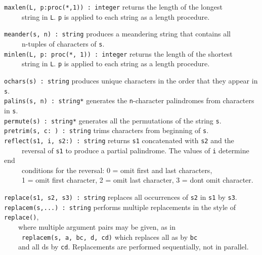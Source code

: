 \texttt{maxlen(L, p:proc({\textquotedbl}*{\textquotedbl},1)) : integer}
returns the length of the longest\\
 \ \ \ \ \ string in \texttt{L}. \texttt{p} is applied to each string as
a {\textquotedbl}length{\textquotedbl} procedure.

\texttt{meander(s, n) : string} produces a
{\textquotedbl}meandering{\textquotedbl} string that contains
all\\
 \ \ \ \ \ n-tuples of characters of \texttt{s}.\\
\texttt{minlen(L, p: proc({\textquotedbl}*{\textquotedbl}, 1)) :
integer} returns the length of the shortest\\
 \ \ \ \ \ string in \texttt{L}. \texttt{p} is applied to each string as
a {\textquotedbl}length{\textquotedbl} procedure.

\texttt{ochars(s) : string} produces unique characters in the order that
they appear in \texttt{s}.\\
\texttt{palins(s, n) : string*} generates the \texttt{n}{}-character
palindromes from characters in \texttt{s}.\\
\texttt{permute(s) : string*} generates all the permutations of the
string \texttt{s}.\\
\texttt{pretrim(s, c:{\textquotesingle} {\textquotesingle}) : string}
trims characters from beginning of \texttt{s}.\\
\texttt{reflect(s1, i, s2:{\textquotedbl}{\textquotedbl}) : string}
returns \texttt{s1} concatenated with \texttt{s2} and the\\
 \ \ \ \ \ reversal of \texttt{s1} to produce a partial palindrome. The
values of \texttt{i} determine {\textquotedbl}end\\
 \ \ \ \ \ conditions{\textquotedbl} for the reversal: 0 = omit first
and last characters,\\
 \ \ \ \ \ 1 = omit first character, 2 = omit last character, 3 =
don{\textquotesingle}t omit character.

\texttt{replace(s1, s2, s3) : string} replaces all occurrences of
\texttt{s2} in \texttt{s1} by \texttt{s3}.\\
\texttt{replacem(s,...) : string} performs multiple replacements in the style of \texttt{replace()},\\
 \ \ \ \ where multiple
argument pairs may be given, as in\\
 \ \ \ \ \ \texttt{replacem(s, {\textquotedbl}a{\textquotedbl},
{\textquotedbl}bc{\textquotedbl}, {\textquotedbl}d{\textquotedbl},
{\textquotedbl}cd{\textquotedbl})} which replaces all
a{\textquotesingle}s by
\texttt{{\textquotedbl}bc{\textquotedbl}}\\
\ \ \ \ and all d{\textquotesingle}s by
\texttt{{\textquotedbl}cd{\textquotedbl}}. Replacements are performed
sequentially, not in parallel.

